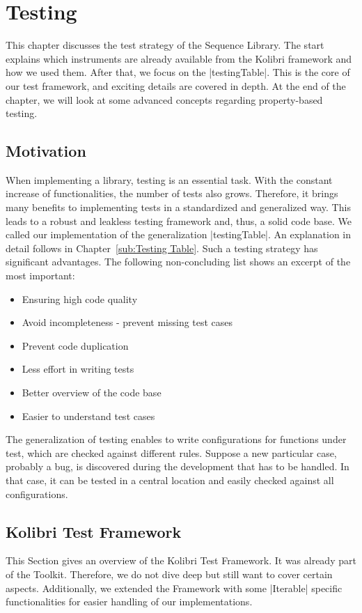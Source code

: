 \section{Testing}
\label{sec:Testing}
This chapter discusses the test strategy of the Sequence Library. The start
explains which instruments are already available from the Kolibri framework and
how we used them. After that, we focus on the |testingTable|. 
This is the core of our test framework, and exciting details are covered in
depth. At the end of the chapter, we will look at some advanced concepts
regarding property-based testing.

\subsection{Motivation}
\label{sub:Motivation}
When implementing a library, testing is an essential task. With the constant
increase of functionalities, the number of tests also grows. Therefore, it
brings many benefits to implementing tests in a standardized and generalized
way. This leads to a robust and
leakless testing framework and, thus, a solid code base.
We called our implementation of the generalization |testingTable|.
An explanation in detail follows in Chapter~\ref{sub:Testing Table}.
Such a testing strategy has significant advantages. 
The following non-concluding list shows an excerpt of the most important:

\begin{itemize}
  \item{Ensuring high code quality}
  \item{Avoid incompleteness - prevent missing test cases}
  \item{Prevent code duplication}
  \item{Less effort in writing tests}
  \item{Better overview of the code base}
  \item{Easier to understand test cases}
\end{itemize}

The generalization of testing enables to write configurations for functions
under test, which are checked against different rules. Suppose a new particular case, probably a bug, is
discovered during the development that has to be handled. In that case, it can
be tested in a central location and easily checked against all configurations.

\subsection{Kolibri Test Framework}
\label{sub:Kolibri Test Framework}
This Section gives an overview of the Kolibri Test Framework. It was already
part of the Toolkit. Therefore, we do not dive deep but still want to cover
certain aspects. Additionally, we extended the Framework with some |Iterable|
specific functionalities for easier handling of our implementations.

